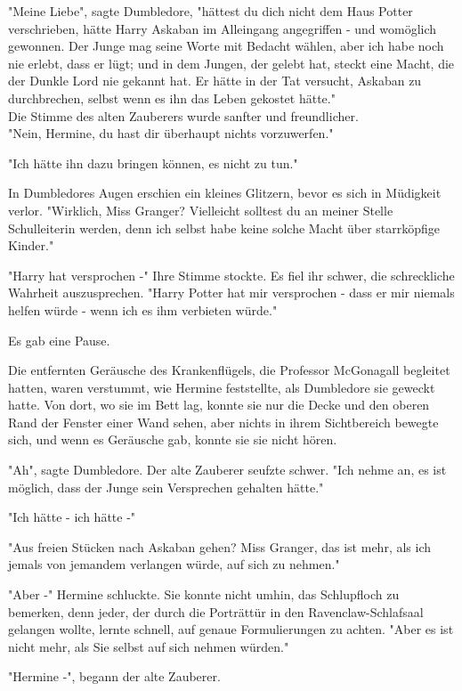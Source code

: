 {"Meine Liebe", sagte Dumbledore, "hättest du dich nicht dem Haus Potter verschrieben, hätte Harry Askaban im Alleingang angegriffen - und womöglich gewonnen. Der Junge mag seine Worte mit Bedacht wählen, aber ich habe noch nie erlebt, dass er lügt; und in dem Jungen, der gelebt hat, steckt eine Macht, die der Dunkle Lord nie gekannt hat. Er hätte in der Tat versucht, Askaban zu durchbrechen, selbst wenn es ihn das Leben gekostet hätte."\\ Die Stimme des alten Zauberers wurde sanfter und freundlicher.\\ "Nein, Hermine, du hast dir überhaupt nichts vorzuwerfen."

"Ich hätte ihn dazu bringen können, es nicht zu tun."

In Dumbledores Augen erschien ein kleines Glitzern, bevor es sich in Müdigkeit verlor. "Wirklich, Miss Granger? Vielleicht solltest du an meiner Stelle Schulleiterin werden, denn ich selbst habe keine solche Macht über starrköpfige Kinder."

"Harry hat versprochen -" Ihre Stimme stockte. Es fiel ihr schwer, die schreckliche Wahrheit auszusprechen. "Harry Potter hat mir versprochen - dass er mir niemals helfen würde - wenn ich es ihm verbieten würde."

Es gab eine Pause.

Die entfernten Geräusche des Krankenflügels, die Professor McGonagall begleitet hatten, waren verstummt, wie Hermine feststellte, als Dumbledore sie geweckt hatte. Von dort, wo sie im Bett lag, konnte sie nur die Decke und den oberen Rand der Fenster einer Wand sehen, aber nichts in ihrem Sichtbereich bewegte sich, und wenn es Geräusche gab, konnte sie sie nicht hören.

"Ah", sagte Dumbledore. Der alte Zauberer seufzte schwer. "Ich nehme an, es ist möglich, dass der Junge sein Versprechen gehalten hätte."

"Ich hätte - ich hätte -"

"Aus freien Stücken nach Askaban gehen? Miss Granger, das ist mehr, als ich jemals von jemandem verlangen würde, auf sich zu nehmen."

"Aber -" Hermine schluckte. Sie konnte nicht umhin, das Schlupfloch zu bemerken, denn jeder, der durch die Porträttür in den Ravenclaw-Schlafsaal gelangen wollte, lernte schnell, auf genaue Formulierungen zu achten. "Aber es ist nicht mehr, als Sie selbst auf sich nehmen würden."

"Hermine -", begann der alte Zauberer.

}
